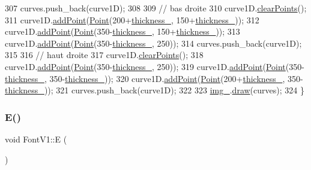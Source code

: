 \begin{DoxyCode}
307     curves.push\_back(curve1D);
308 
309     \textcolor{comment}{// bas droite}
310     curve1D.\mbox{\hyperlink{class_bezier_curve_a0ba8ce66d5af5971ae6a1b506029728e}{clearPoints}}();
311     curve1D.\mbox{\hyperlink{class_bezier_curve_a38d16c18b36ae45619b05e26e226cf34}{addPoint}}(\mbox{\hyperlink{class_point}{Point}}(200+\mbox{\hyperlink{class_font_v1_aed8040e76be9a52833627b92f0fb4e5f}{thickness\_}}, 150+\mbox{\hyperlink{class_font_v1_aed8040e76be9a52833627b92f0fb4e5f}{thickness\_}}));
312     curve1D.\mbox{\hyperlink{class_bezier_curve_a38d16c18b36ae45619b05e26e226cf34}{addPoint}}(\mbox{\hyperlink{class_point}{Point}}(350-\mbox{\hyperlink{class_font_v1_aed8040e76be9a52833627b92f0fb4e5f}{thickness\_}}, 150+\mbox{\hyperlink{class_font_v1_aed8040e76be9a52833627b92f0fb4e5f}{thickness\_}}));
313     curve1D.\mbox{\hyperlink{class_bezier_curve_a38d16c18b36ae45619b05e26e226cf34}{addPoint}}(\mbox{\hyperlink{class_point}{Point}}(350-\mbox{\hyperlink{class_font_v1_aed8040e76be9a52833627b92f0fb4e5f}{thickness\_}}, 250));
314     curves.push\_back(curve1D);
315 
316     \textcolor{comment}{// haut droite}
317     curve1D.\mbox{\hyperlink{class_bezier_curve_a0ba8ce66d5af5971ae6a1b506029728e}{clearPoints}}();
318     curve1D.\mbox{\hyperlink{class_bezier_curve_a38d16c18b36ae45619b05e26e226cf34}{addPoint}}(\mbox{\hyperlink{class_point}{Point}}(350-\mbox{\hyperlink{class_font_v1_aed8040e76be9a52833627b92f0fb4e5f}{thickness\_}}, 250));
319     curve1D.\mbox{\hyperlink{class_bezier_curve_a38d16c18b36ae45619b05e26e226cf34}{addPoint}}(\mbox{\hyperlink{class_point}{Point}}(350-\mbox{\hyperlink{class_font_v1_aed8040e76be9a52833627b92f0fb4e5f}{thickness\_}}, 350-\mbox{\hyperlink{class_font_v1_aed8040e76be9a52833627b92f0fb4e5f}{thickness\_}}));
320     curve1D.\mbox{\hyperlink{class_bezier_curve_a38d16c18b36ae45619b05e26e226cf34}{addPoint}}(\mbox{\hyperlink{class_point}{Point}}(200+\mbox{\hyperlink{class_font_v1_aed8040e76be9a52833627b92f0fb4e5f}{thickness\_}}, 350-\mbox{\hyperlink{class_font_v1_aed8040e76be9a52833627b92f0fb4e5f}{thickness\_}}));
321     curves.push\_back(curve1D);
322 
323     \mbox{\hyperlink{class_font_v1_a00569e3e3c4b70f437b63f396f735fb0}{img\_}}.\mbox{\hyperlink{class_image_a8d162f3cab956131d58708c09aa560b0}{draw}}(curves);
324 \}
\end{DoxyCode}
\mbox{\label{class_font_v1_ab8a34299af7a36cfd94c2691b579a0fa}} 
\subsubsection{\texorpdfstring{E()}{E()}}
{\footnotesize\ttfamily void Font\+V1\+::E (\begin{DoxyParamCaption}{ }\end{DoxyParamCaption})}



